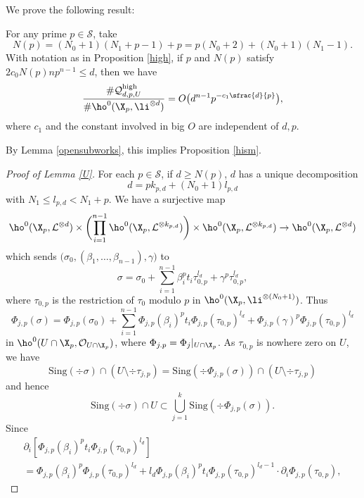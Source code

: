 We prove the following result:
\begin{lem}\label{U}
For any prime $p\in \mathcal{S}$, take
\[
N(p)=(N_0+1)(N_1+p-1)+p=p(N_0+2)+(N_0+1)(N_1-1).
\]
With notation as in Proposition \ref{high}, if $p$ and $N(p)$ satisfy $2c_0N(p)np^{n-1}\leq d$, then we have
\[
\frac{\#\mathcal{Q}_{d,p,U}^{\mathrm{high}}}{\#\ho^0(\X_{p}, \li^{\otimes d})}=O\bigl(d^{n-1}p^{-c_1\sfrac{d}{p}} \bigr),
\]
where $c_1$ and the constant involved in big $O$ are independent of $d,p$.
\end{lem}
By Lemma \ref{opensubworks}, this implies Proposition \ref{hism}.
\begin{proof}[Proof of Lemma \ref{U}]
For each $p\in \mathcal{S}$, if $d\geq N(p)$, $d$ has a unique decomposition\vspace*{-3pt}\Changel
\[
d=pk_{p,d}+(N_0+1)l_{p,d}
\]
with $N_1\leq l_{p,d}< N_1+p$. We have a surjective map\vspace*{-3pt}
\begin{align*}
\ho^0(\X_p,\mathcal{L}^{\otimes d})\times \biggl(\prod_{i=1}^{n-1} \ho^0(\X_p,\mathcal{L}^{\otimes k_{p,d}}) \biggr) \times \ho^0(\X_p, \mathcal{L}^{\otimes k_{p,d}}) \to \ho^0(\X_p, \mathcal{L}^{\otimes d})
\end{align*}
which sends $\big(\sigma_{0}, (\beta_1,\dots, \beta_{n-1}), \gamma\big)$ to\vspace*{-3pt}\enlargethispage{.7\baselineskip}%
\[
\sigma=\sigma_{0}+\sum_{i=1}^{n-1} \beta_i^pt_i\tau_{0,p}^{l_d}+\gamma^p\tau_{0,p}^{l_d},
\]
where $\tau_{0,p}$ is the restriction of $\tau_0$ modulo $p$ in $\ho^0(\X_p, \li^{\otimes (N_0+1)})$. Thus\vspace*{-3pt}
\[
\Phi_{j,p}(\sigma)=\Phi_{j,p}(\sigma_0)+\sum_{i=1}^{n-1} \Phi_{j,p}(\beta_i)^pt_i\Phi_{j,p}(\tau_{0,p})^{l_d}+\Phi_{j,p}(\gamma)^p\Phi_{j,p}(\tau_{0,p})^{l_d}
\]
in $\ho^0(U\cap \X_p,\mathcal{O}_{U\cap \X_p})$, where $\Phi_{j.p}=\Phi_j|_{U\cap \X_p}$. As $\tau_{0,p}$ is nowhere zero on $U$, we have
\[
\mathrm{Sing}(\div \sigma)\cap (U\setminus \div \tau_{j,p}) = \mathrm{Sing}(\div \Phi_{j,p}(\sigma))\cap (U\setminus \div \tau_{j,p})
\]
and hence\vspace*{-5pt}
\[
\mathrm{Sing}(\div \sigma)\cap U \subset \bigcup_{j=1}^k \mathrm{Sing}(\div \Phi_{j,p}(\sigma)).
\]
Since\vspace*{-3pt}
\begin{multline*}
\partial_i[\Phi_{j,p}(\beta_i)^p t_i \Phi_{j,p}(\tau_{0,p})^{l_d}]\\[-3pt]=\Phi_{j,p}(\beta_i)^p \Phi_{j,p}(\tau_{0,p})^{l_d} + l_d \Phi_{j,p}(\beta_i)^p t_i \Phi_{j,p}(\tau_{0,p})^{l_d-1}\cdot \partial_i \Phi_{j,p}(\tau_{0,p}),

\end{multline*}
\end{proof}
